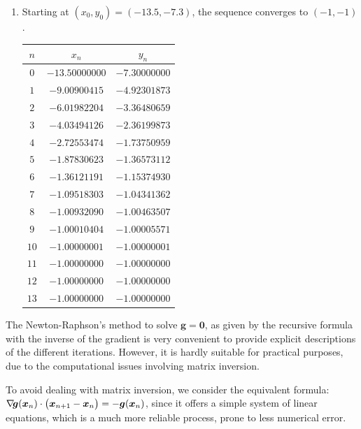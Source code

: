 \begin{example}
\begin{enumerate}
	\item Starting at $(x_0, y_0) = (-13.5, -7.3)$, the sequence converges to $(-1,-1)$.  %
	\begin{center}
	\begin{tabular}{|c|c|c|} \hline 
	$n$ & $x_n$ & $y_n$ \\ \hline \hline 
	$0$ & $-13.50000000$ & $-7.30000000$ \\ \hline 
	$1$ & $-9.00900415$ & $-4.92301873$ \\ \hline 
	$2$ & $-6.01982204$ & $-3.36480659$ \\ \hline 
	$3$ & $-4.03494126$ & $-2.36199873$ \\ \hline 
	$4$ & $-2.72553474$ & $-1.73750959$ \\ \hline 
	$5$ & $-1.87830623$ & $-1.36573112$ \\ \hline 
	$6$ & $-1.36121191$ & $-1.15374930$ \\ \hline 
	$7$ & $-1.09518303$ & $-1.04341362$ \\ \hline 
	$8$ & $-1.00932090$ & $-1.00463507$ \\ \hline 
	$9$ & $-1.00010404$ & $-1.00005571$ \\ \hline 
	$10$ & $-1.00000001$ & $-1.00000001$ \\ \hline 
	$11$ & $-1.00000000$ & $-1.00000000$ \\ \hline 
	$12$ & $-1.00000000$ & $-1.00000000$ \\ \hline 
	$13$ & $-1.00000000$ & $-1.00000000$ \\ \hline 
	\end{tabular}
	\end{center}
\end{enumerate}
\end{example}

\begin{remark}
The Newton-Raphson's method to solve $\boldsymbol{g}=\boldsymbol{0}$, as given by the recursive formula with the inverse of the gradient is very convenient to provide explicit descriptions of the different iterations.  However, it is hardly suitable for practical purposes, due to the computational issues involving matrix inversion.

To avoid dealing with matrix inversion, we consider the equivalent formula: $\mathop{\nabla\! {\boldsymbol{g}}}(\boldsymbol{x}_n) \cdot \big( \boldsymbol{x}_{n+1} - \boldsymbol{x}_n \big) = -\boldsymbol{g}(\boldsymbol{x}_n)$, since it offers a simple system of linear equations, which is a much more reliable process, prone to less numerical error.
\end{remark}

